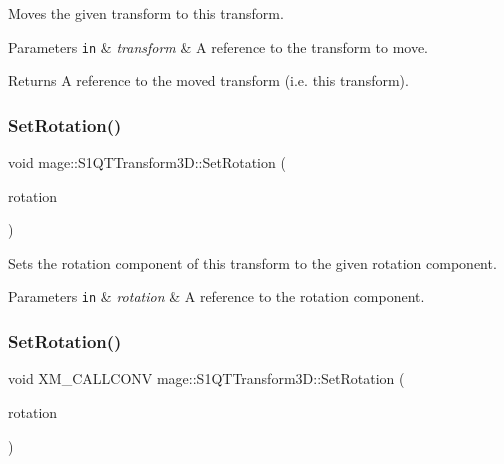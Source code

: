 Moves the given transform to this transform.


\begin{DoxyParams}[1]{Parameters}
\mbox{\tt in}  & {\em transform} & A reference to the transform to move. \\
\hline
\end{DoxyParams}
\begin{DoxyReturn}{Returns}
A reference to the moved transform (i.\+e. this transform). 
\end{DoxyReturn}
\mbox{\label{classmage_1_1_s1_q_t_transform3_d_aef471fb4c0ed7acd18eb101a3e077891}} 
\subsubsection{\texorpdfstring{Set\+Rotation()}{SetRotation()}\hspace{0.1cm}{\footnotesize\ttfamily [1/2]}}
{\footnotesize\ttfamily void mage\+::\+S1\+Q\+T\+Transform3\+D\+::\+Set\+Rotation (\begin{DoxyParamCaption}\item[{const \mbox{\hyperlink{namespacemage_a851648f37dfb126a2d2f973e102861ad}{F32x4}} \&}]{rotation }\end{DoxyParamCaption})\hspace{0.3cm}{\ttfamily [noexcept]}}

Sets the rotation component of this transform to the given rotation component.


\begin{DoxyParams}[1]{Parameters}
\mbox{\tt in}  & {\em rotation} & A reference to the rotation component. \\
\hline
\end{DoxyParams}
\mbox{\label{classmage_1_1_s1_q_t_transform3_d_a4088c60f246edcd34963b9b7b0caa2ed}} 
\subsubsection{\texorpdfstring{Set\+Rotation()}{SetRotation()}\hspace{0.1cm}{\footnotesize\ttfamily [2/2]}}
{\footnotesize\ttfamily void X\+M\+\_\+\+C\+A\+L\+L\+C\+O\+NV mage\+::\+S1\+Q\+T\+Transform3\+D\+::\+Set\+Rotation (\begin{DoxyParamCaption}\item[{F\+X\+M\+V\+E\+C\+T\+OR}]{rotation }\end{DoxyParamCaption})\hspace{0.3cm}{\ttfamily [noexcept]}}

